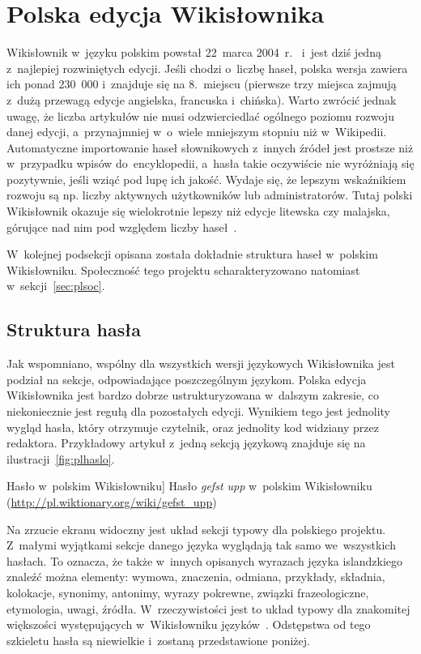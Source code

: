 \section{Polska edycja Wikisłownika}
\label{sec:plwikt}
Wikisłownik w~języku polskim powstał 22~marca 2004~r.~\cite{wikt:home} i~jest dziś jedną z~najlepiej rozwiniętych edycji. Jeśli chodzi o~liczbę haseł, polska wersja zawiera ich ponad 230~000 i~znajduje się na 8.~miejscu (pierwsze trzy miejsca zajmują z~dużą przewagą edycje angielska, francuska i~chińska). Warto zwrócić jednak uwagę, że liczba artykułów nie musi odzwierciedlać ogólnego poziomu rozwoju danej edycji, a~przynajmniej w~o~wiele mniejszym stopniu niż w~Wikipedii. Automatyczne importowanie haseł słownikowych z~innych źródeł jest prostsze niż w~przypadku wpisów do~encyklopedii, a~hasła takie oczywiście nie wyróżniają się pozytywnie, jeśli wziąć pod lupę ich jakość. Wydaje się, że lepszym wskaźnikiem rozwoju są np. liczby aktywnych użytkowników lub administratorów. Tutaj polski Wikisłownik okazuje się wielokrotnie lepszy niż edycje litewska czy malajska, górujące nad nim pod względem liczby haseł~\cite{wikt:list}.

W~kolejnej podsekcji opisana została dokładnie struktura haseł w~polskim Wikisłowniku. Społeczność tego projektu scharakteryzowano natomiast w~sekcji~\ref{sec:plsoc}.

\subsection{Struktura hasła}
\label{wikt:structure}
Jak wspomniano, wspólny dla wszystkich wersji językowych Wikisłownika jest podział na sekcje, odpowiadające poszczególnym językom. Polska edycja Wikisłownika jest bardzo dobrze ustrukturyzowana w~dalszym zakresie, co niekoniecznie jest regułą dla pozostałych edycji. Wynikiem tego jest jednolity wygląd hasła, który otrzymuje czytelnik, oraz jednolity kod widziany przez redaktora. Przykładowy artykuł z~jedną sekcją językową znajduje się na ilustracji~\ref{fig:plhaslo}.

\begin{illustration}
	\caption
		[Hasło w~polskim Wikisłowniku]
		{Hasło \emph{gefst upp} w~polskim Wikisłowniku (\protect\url{http://pl.wiktionary.org/wiki/gefst_upp})}
	\label{fig:plhaslo}
\end{illustration}

Na zrzucie ekranu widoczny jest układ sekcji typowy dla polskiego projektu. Z~małymi wyjątkami sekcje danego języka wyglądają tak samo we~wszystkich hasłach. To oznacza, że także w~innych opisanych wyrazach języka islandzkiego znaleźć można elementy: wymowa, znaczenia, odmiana, przykłady, składnia, kolokacje, synonimy, antonimy, wyrazy pokrewne, związki frazeologiczne, etymologia, uwagi, źródła. W~rzeczywistości jest to układ typowy dla znakomitej większości występujących w~Wikisłowniku języków~\cite{wikt:zasady}. Odstępstwa od tego szkieletu hasła są niewielkie i~zostaną przedstawione poniżej.

